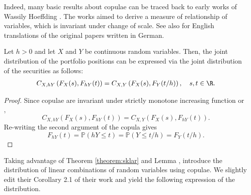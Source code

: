 Indeed, many basic results about copulae can be traced back to early
works of Wassily Hoeffding \citep{hoedffding1940, hoedffding1941}. 
The works aimed to derive a measure of relationship of variables,
which is invariant under change of scale. 
See also \citet{hoeffding2012collected} for English translations of
the original papers written in German. 

\begin{lemma}
  \label{lemma:copula}
  Let $h>0$ and let $X$ and $Y$ be continuous random variables. Then,
  the joint distribution of the portfolio positions 
  can be expressed via the joint distribution of the securities as
  follows:
  \begin{align}
  C_{X, hY}\left(F_X(s),F_{hY}(t)\right) = C_{X,
    Y}\left(F_X(s),F_{Y}(t/h)\right), \quad s,t\in \R.
    \end{align}
  \end{lemma}

\begin{proof}
  Since copulae are invariant under strictly monotone increasing
  function \citet[Theorem 3 (i)]{schweizer1981nonparametric} or
  \citet[Theorem 2.4.3]{Nelsen1999}, 
  \begin{equation*}
    C_{X, hY}\left(F_X(s),F_{hY}(t)\right) = C_{X, Y}\left(F_X(s),F_{hY}(t)\right).
    \end{equation*}
Re-writing the second argument of the copula gives
\begin{equation*}
  F_{hY}(t) = \mathbb{P}(hY \leq t)
  = \mathbb{P}(Y \leq t/h)
  = F_Y(t/h).
\end{equation*}
\end{proof}

Taking advantage of Theorem \ref{theorem:sklar} and Lemma \label{lemma:copula}, \citet{barbi2014copula}
introduce the distribution of linear combinations of random variables
using copulae. 
We slightly edit their Corollary 2.1 of their work and yield the 
following expression of the distribution. 

